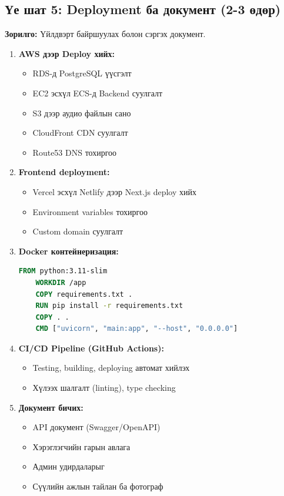 \subsection{Үе шат 5: Deployment ба документ (2-3 өдөр)}

\textbf{Зорилго:} Үйлдвэрт байршуулах болон сэргэх документ.

\begin{enumerate}
    \item \textbf{AWS дээр Deploy хийх:}
    \begin{itemize}
        \item RDS-д PostgreSQL үүсгэлт
        \item EC2 эсхүл ECS-д Backend суулгалт
        \item S3 дээр аудио файлын сано
        \item CloudFront CDN суулгалт
        \item Route53 DNS тохиргоо
    \end{itemize}
    
    \item \textbf{Frontend deployment:}
    \begin{itemize}
        \item Vercel эсхүл Netlify дээр Next.js deploy хийх
        \item Environment variables тохиргоо
        \item Custom domain суулгалт
    \end{itemize}
    
    \item \textbf{Docker контейнеризация:}
    \begin{lstlisting}[language=Dockerfile]
    FROM python:3.11-slim
    WORKDIR /app
    COPY requirements.txt .
    RUN pip install -r requirements.txt
    COPY . .
    CMD ["uvicorn", "main:app", "--host", "0.0.0.0"]
    \end{lstlisting}
    
    \item \textbf{CI/CD Pipeline (GitHub Actions):}
    \begin{itemize}
        \item Testing, building, deploying автомат хийлэх
        \item Хүлээх шалгалт (linting), type checking
    \end{itemize}
    
    \item \textbf{Документ бичих:}
    \begin{itemize}
        \item API документ (Swagger/OpenAPI)
        \item Хэрэглэгчийн гарын авлага
        \item Админ удирдаларыг
        \item Сүүлийн ажлын тайлан ба фотограф
    \end{itemize}
\end{enumerate}

